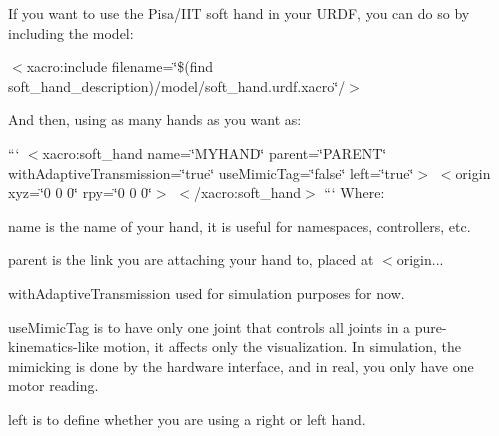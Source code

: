 If you want to use the Pisa/\-I\-I\-T soft hand in your U\-R\-D\-F, you can do so by including the model\-:

{\ttfamily $<$xacro\-:include filename=\char`\"{}\$(find soft\-\_\-hand\-\_\-description)/model/soft\-\_\-hand.\-urdf.\-xacro\char`\"{}/$>$}

And then, using as many hands as you want as\-:

``` $<$xacro\-:soft\-\_\-hand name=\char`\"{}\-M\-Y\-H\-A\-N\-D\char`\"{} parent=\char`\"{}\-P\-A\-R\-E\-N\-T\char`\"{} with\-Adaptive\-Transmission=\char`\"{}true\char`\"{} use\-Mimic\-Tag=\char`\"{}false\char`\"{} left=\char`\"{}true\char`\"{}$>$ $<$origin xyz=\char`\"{}0 0 0\char`\"{} rpy=\char`\"{}0 0 0\char`\"{}$>$ $<$/xacro\-:soft\-\_\-hand$>$ ``` Where\-:

{\ttfamily name} is the name of your hand, it is useful for namespaces, controllers, etc.

{\ttfamily parent} is the link you are attaching your hand to, placed at {\ttfamily $<$origin...}

{\ttfamily with\-Adaptive\-Transmission} used for simulation purposes for now.

{\ttfamily use\-Mimic\-Tag} is to have only one joint that controls all joints in a pure-\/kinematics-\/like motion, it affects only the visualization. In simulation, the mimicking is done by the hardware interface, and in real, you only have one motor reading.

{\ttfamily left} is to define whether you are using a right or left hand. 